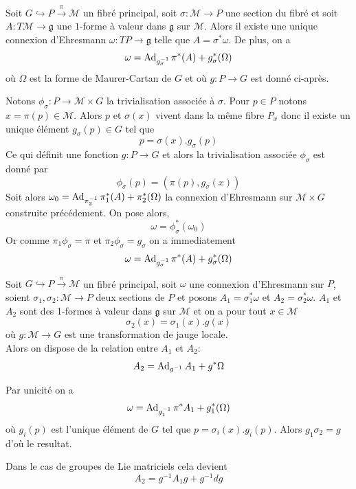 \documentclass[12pt, a4paper]{book}
\begin{document}
\begin{thm}
Soit $G \hookrightarrow P \overset{\pi}{\to} \mathcal{M}$ un fibré principal, soit $\sigma: \mathcal{M} \to P$ une section du fibré et soit $A: T\mathcal{M} \to \mathfrak{g}$ une $1$-forme à valeur dans $\mathfrak{g}$ sur $\mathcal{M}$. Alors il existe une unique connexion d'Ehresmann $\omega: TP \to \mathfrak{g}$ telle que $A = \sigma^*\omega$. De plus, on a
$$\omega = \operatorname{Ad}_{g_\sigma^{-1}}\pi^*(A)+g_\sigma^*(\Omega)$$
où $\Omega$ est la forme de Maurer-Cartan de $G$ et où $g: P \to G$ est donné ci-après.
\end{thm}
\begin{preu}
Notons $\phi_\sigma: P\to \mathcal{M}\times G$ la trivialisation associée à $\sigma$. Pour $p\in P$ notons $x = \pi(p)\in \mathcal{M}$. Alors $p$ et $\sigma(x)$ vivent dans la même fibre $P_x$ donc il existe un unique élément $g_\sigma(p)\in G$ tel que
$$p = \sigma(x).g_\sigma(p)$$
Ce qui définit une fonction $g: P\to G$ et alors la trivialisation associée $\phi_\sigma$ est donné par
$$\phi_\sigma(p) = (\pi(p), g_\sigma(x))$$
Soit alors $\omega_0 = \operatorname{Ad}_{\pi_2^{-1}}\pi_1^*(A) + \pi_2^*(\Omega)$ la connexion d'Ehresmann sur $\mathcal{M}\times G$ construite précédement. On pose alors,
$$\omega = \phi_\sigma^*(\omega_0)$$
Or comme $\pi_1\phi_\sigma = \pi$ et $\pi_2\phi_\sigma = g_\sigma$ on a immediatement 
$$\omega = \operatorname{Ad}_{g_\sigma^{-1}}\pi^*(A)+g_\sigma^*(\Omega)$$
\end{preu}

\begin{thm}
Soit $G \hookrightarrow P \overset{\pi}{\to} \mathcal{M}$ un fibré principal, soit $\omega$ une connexion d'Ehresmann sur $P$, soient $\sigma_1, \sigma_2:\mathcal{M}\to P$ deux sections de $P$ et posons $A_1 = \sigma_1^*\omega$ et $A_2 = \sigma_2^*\omega$. $A_1$ et $A_2$ sont des 1-formes à valeur dans $\mathfrak{g}$ sur $\mathcal{M}$ et on a pour tout $x\in \mathcal{M}$ 
$$\sigma_2(x) = \sigma_1(x).g(x)$$
où $g:\mathcal{M} \to G$ est une transformation de jauge locale. \\
Alors on dispose de la relation entre $A_1$ et $A_2$:
$$A_2 = \operatorname{Ad}_{g^{-1}}A_1+g^*\Omega$$
\end{thm}
\begin{preu}
Par unicité on a
$$\omega = \operatorname{Ad}_{g_1^{-1}}\pi^*A_1+g_1^*(\Omega)$$
où $g_i(p)$ est l'unique élément de $G$ tel que $p = \sigma_i(x).g_i(p)$.
Alors $g_1\sigma_2 = g$ d'où le resultat.
\end{preu}

\begin{rem}
Dans le cas de groupes de Lie matriciels cela devient
$$A_2 = g^{-1}A_1g + g^{-1}dg$$
\end{rem}
\end{document}
